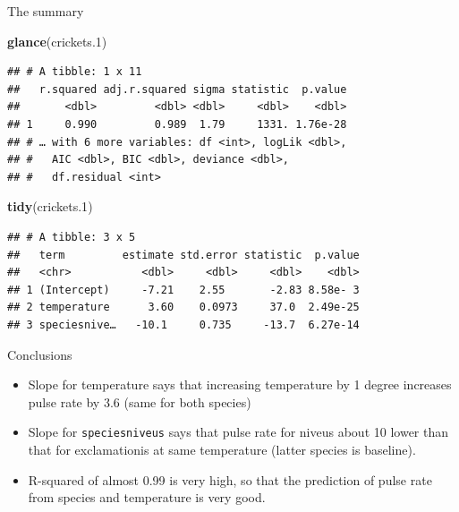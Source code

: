 \documentclass[
  ignorenonframetext,
]{beamer}
\newenvironment{Shaded}{\begin{snugshade}}{\end{snugshade}}
\newcommand{\FloatTok}[1]{\textcolor[rgb]{0.00,0.00,0.81}{#1}}
\newcommand{\KeywordTok}[1]{\textcolor[rgb]{0.13,0.29,0.53}{\textbf{#1}}}
\newcommand{\NormalTok}[1]{#1}
\providecommand{\tightlist}{%
  \setlength{\itemsep}{0pt}\setlength{\parskip}{0pt}}
\begin{document}
\begin{frame}[fragile]{The summary}
\protect\hypertarget{the-summary}{}

\begin{Shaded}
\begin{Highlighting}[]
\KeywordTok{glance}\NormalTok{(crickets}\FloatTok{.1}\NormalTok{)}
\end{Highlighting}
\end{Shaded}

\begin{verbatim}
## # A tibble: 1 x 11
##   r.squared adj.r.squared sigma statistic  p.value
##       <dbl>         <dbl> <dbl>     <dbl>    <dbl>
## 1     0.990         0.989  1.79     1331. 1.76e-28
## # … with 6 more variables: df <int>, logLik <dbl>,
## #   AIC <dbl>, BIC <dbl>, deviance <dbl>,
## #   df.residual <int>
\end{verbatim}

\begin{Shaded}
\begin{Highlighting}[]
\KeywordTok{tidy}\NormalTok{(crickets}\FloatTok{.1}\NormalTok{)}
\end{Highlighting}
\end{Shaded}

\begin{verbatim}
## # A tibble: 3 x 5
##   term         estimate std.error statistic  p.value
##   <chr>           <dbl>     <dbl>     <dbl>    <dbl>
## 1 (Intercept)     -7.21    2.55       -2.83 8.58e- 3
## 2 temperature      3.60    0.0973     37.0  2.49e-25
## 3 speciesnive…   -10.1     0.735     -13.7  6.27e-14
\end{verbatim}

\end{frame}

\begin{frame}[fragile]{Conclusions}
\protect\hypertarget{conclusions}{}

\begin{itemize}
\tightlist
\item
  Slope for temperature says that increasing temperature by 1 degree
  increases pulse rate by 3.6 (same for both species)
\item
  Slope for \texttt{speciesniveus} says that pulse rate for niveus about
  10 lower than that for exclamationis at same temperature (latter
  species is baseline).
\item
  R-squared of almost 0.99 is very high, so that the prediction of pulse
  rate from species and temperature is very good.
\end{itemize}

\end{frame}
\end{document}
